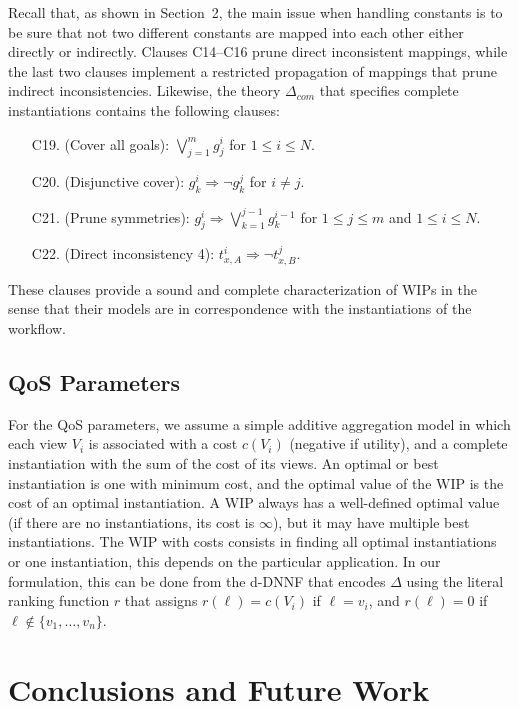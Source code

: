 \documentclass{llncs}
\begin{document}
Recall that, as shown in Section~2, the main issue when handling
constants is to be sure that not two different constants are mapped
into each other either directly or indirectly.
Clauses C14--C16 prune direct inconsistent mappings, while the last
two clauses implement a restricted propagation of mappings that prune
indirect inconsistencies.
Likewise, the theory $\Delta_{com}$ that specifies complete
instantiations contains the following clauses:
\begin{enumerate}[C10.]
\item[C19.] (Cover all goals): $\bigvee_{j=1}^m g^i_j$ for $1\leq i\leq N$.
\item[C20.] (Disjunctive cover): $g^i_k \Rightarrow \neg g^j_k$ for $i\neq j$.
\item[C21.] (Prune symmetries): $g^i_j \Rightarrow \bigvee_{k=1}^{j-1} g^{i-1}_k$
            for $1\leq j\leq m$ and $1\leq i\leq N$.
\item[C22.] (Direct inconsistency 4): $t^i_{x,A} \Rightarrow \neg t^j_{x,B}$.
\end{enumerate}
These clauses provide a sound and complete characterization of WIPs in the
sense that their models are in correspondence with the
instantiations of the workflow.

\subsection{QoS Parameters}

For the QoS parameters, we assume a simple additive aggregation model in
which each view $V_i$ is associated with a cost $c(V_i)$ (negative if utility),
and a complete instantiation with the sum of the cost of its views.
An optimal or best instantiation is one with minimum cost, and the
optimal value of the WIP is the cost of an optimal instantiation.
A WIP always has a well-defined optimal value (if there are no instantiations,
its cost is $\infty$), but it may have multiple best instantiations.
The WIP with costs consists in finding all optimal instantiations or
one instantiation, this depends on the particular application.
In our formulation, this can be done from the d-DNNF that encodes $\Delta$
using the literal ranking function $r$ that assigns $r(\ell)=c(V_i)$ if
$\ell=v_i$, and $r(\ell)=0$ if $\ell\notin\{v_1,\ldots,v_n\}$.

\section{Conclusions and Future Work}
\end{document}
